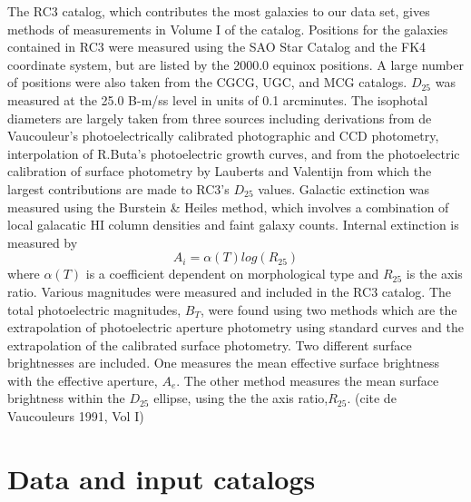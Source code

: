 \documentclass[12pt,preprint,pdftex]{aastex}
\newcommand{\project}[1]{\textsl{#1}}
\begin{document}
The RC3 catalog, which contributes the most galaxies to our data set, gives methods of measurements in Volume I of the catalog. Positions for the galaxies contained in RC3 were measured using the SAO Star Catalog and the FK4 coordinate system, but are listed by the 2000.0 equinox positions. A large number of positions were also taken from the CGCG, UGC, and MCG catalogs. $D_{25}$ was measured at the 25.0 B-m/ss level in units of 0.1 arcminutes. The isophotal diameters are largely taken from three sources including derivations from de Vaucouleur's photoelectrically calibrated photographic and CCD photometry, interpolation of R.Buta's photoelectric growth curves, and from the photoelectric calibration of surface photometry by Lauberts and Valentijn from which the largest contributions are made to RC3's $D_{25}$ values. Galactic extinction was measured using the Burstein \& Heiles method, which involves a combination of local galacatic HI column densities and faint galaxy counts. Internal extinction is measured by \begin{equation} A_i= \alpha(T)log(R_{25}) \end{equation} where $\alpha(T)$ is a coefficient dependent on morphological type and $R_{25}$ is the axis ratio. Various magnitudes were measured and included in the RC3 catalog. The total photoelectric magnitudes, $B_T$, were found using two methods which are the extrapolation of photoelectric aperture photometry using standard curves and the extrapolation of the calibrated surface photometry. Two different surface brightnesses are included. One measures the mean effective surface brightness with the effective aperture, $A_e$. The other method measures the mean surface brightness within the $D_{25}$ ellipse, using the the axis ratio,$R_{25}$. (cite de Vaucouleurs 1991, Vol I)

\section{Data and input catalogs}

\end{document}

